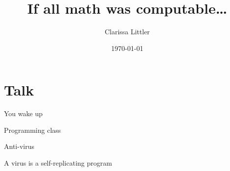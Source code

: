 \documentclass[presentation]{beamer}
\author{Clarissa Littler}
\date{\today}
\title{If all math was computable\ldots{}}
\begin{document}
\maketitle


\section{Talk}
\label{sec:org2e66927}

\begin{frame}[label={sec:orge0c899c}]{You wake up}
\end{frame}
\begin{frame}[label={sec:org6560e10}]{Programming class}
\begin{block}{}
\end{block}
\end{frame}
\begin{frame}[label={sec:orgbc548ad}]{Anti-virus}
\begin{block}{A virus is a self-replicating program}
\end{block}
\end{frame}
\end{document}
